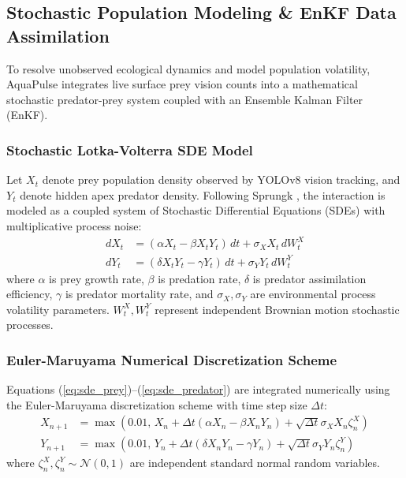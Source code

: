\documentclass[11pt,a4paper]{article}
\newcommand{\citeblue}[1]{\cite{#1}}
\begin{document}
\subsection{Stochastic Population Modeling \& EnKF Data Assimilation}
\label{sec:stochastic_modeling}
To resolve unobserved ecological dynamics and model population volatility, AquaPulse integrates live surface prey vision counts into a mathematical stochastic predator-prey system coupled with an Ensemble Kalman Filter (EnKF).

\subsubsection{Stochastic Lotka-Volterra SDE Model}
Let $X_t$ denote prey population density observed by YOLOv8 vision tracking, and $Y_t$ denote hidden apex predator density. Following Sprungk \citeblue{sprungk2023}, the interaction is modeled as a coupled system of Stochastic Differential Equations (SDEs) with multiplicative process noise:
\begin{align}
dX_t &= (\alpha X_t - \beta X_t Y_t) \, dt + \sigma_X X_t \, dW_t^X \label{eq:sde_prey} \\
dY_t &= (\delta X_t Y_t - \gamma Y_t) \, dt + \sigma_Y Y_t \, dW_t^Y \label{eq:sde_predator}
\end{align}
where $\alpha$ is prey growth rate, $\beta$ is predation rate, $\delta$ is predator assimilation efficiency, $\gamma$ is predator mortality rate, and $\sigma_X, \sigma_Y$ are environmental process volatility parameters. $W_t^X, W_t^Y$ represent independent Brownian motion stochastic processes.

\subsubsection{Euler-Maruyama Numerical Discretization Scheme}
Equations (\ref{eq:sde_prey})--(\ref{eq:sde_predator}) are integrated numerically using the Euler-Maruyama discretization scheme with time step size $\Delta t$:
\begin{align}
X_{n+1} &= \max\left(0.01, \, X_n + \Delta t (\alpha X_n - \beta X_n Y_n) + \sqrt{\Delta t} \sigma_X X_n \zeta_n^X\right) \\
Y_{n+1} &= \max\left(0.01, \, Y_n + \Delta t (\delta X_n Y_n - \gamma Y_n) + \sqrt{\Delta t} \sigma_Y Y_n \zeta_n^Y\right)
\end{align}
where $\zeta_n^X, \zeta_n^Y \sim \mathcal{N}(0, 1)$ are independent standard normal random variables.
\end{document}
